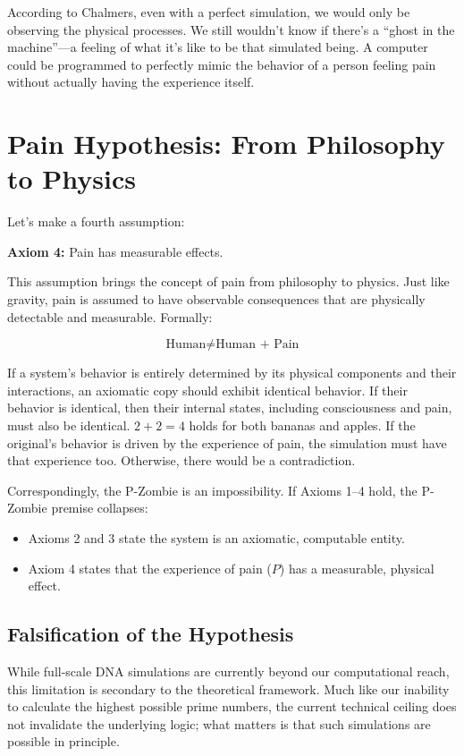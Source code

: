 According to Chalmers, even with a perfect simulation, we would only be observing the physical processes.
We still wouldn't know if there's a ``ghost in the machine''---a feeling of what it's like to be that simulated being.
A computer could be programmed to perfectly mimic the behavior of a person feeling pain without actually having the experience itself. 


\section{Pain Hypothesis: From Philosophy to Physics}

Let's make a fourth assumption:

\textbf{Axiom 4:} Pain has measurable effects.

This assumption brings the concept of pain from philosophy to physics.
Just like gravity, pain is assumed to have observable consequences that are physically detectable and measurable. Formally:

\[
\text{Human} \neq \text{Human + Pain}
\]

If a system's behavior is entirely determined by its physical components and their interactions, an axiomatic copy should exhibit identical behavior.
If their behavior is identical, then their internal states, including consciousness and pain, must also be identical.
$2+2=4$ holds for both bananas and apples.
If the original's behavior is driven by the experience of pain, the simulation must have that experience too.
Otherwise, there would be a contradiction.

Correspondingly, the P-Zombie is an impossibility. If Axioms 1--4 hold, the P-Zombie premise collapses:
\begin{itemize}
    \item Axioms 2 and 3 state the system is an axiomatic, computable entity.
    \item Axiom 4 states that the experience of pain ($P$) has a measurable, physical effect.
\end{itemize}


\subsection*{Falsification of the Hypothesis}

While full-scale DNA simulations are currently beyond our computational reach, this limitation is secondary to the theoretical framework.
Much like our inability to calculate the highest possible prime numbers, the current technical ceiling does not invalidate the underlying logic; what matters is that such simulations are possible in principle.

